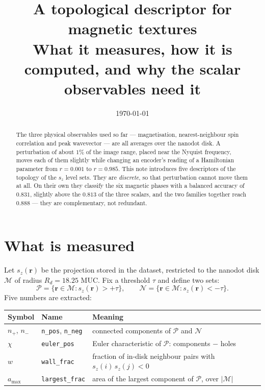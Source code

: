 \documentclass[11pt,a4paper]{article}
\title{A topological descriptor for magnetic textures\\
       \large What it measures, how it is computed, and why the scalar observables need it}
\author{}
\date{\today}
\begin{document}
\maketitle

\begin{abstract}
The three physical observables used so far --- magnetisation, nearest-neighbour spin
correlation and peak wavevector --- are all averages over the nanodot disk. A perturbation
of about $1\%$ of the image range, placed near the Nyquist frequency, moves each of them
slightly while changing an encoder's reading of a Hamiltonian parameter from $r=0.001$ to
$r=0.985$. This note introduces five descriptors of the topology of the $s_z$ level sets.
They are \emph{discrete}, so that perturbation cannot move them at all. On their own they
classify the six magnetic phases with a balanced accuracy of $0.831$, slightly above the
$0.813$ of the three scalars, and the two families together reach $0.888$ --- they are
complementary, not redundant.
\end{abstract}

\section{What is measured}

Let $s_z(\mathbf{r})$ be the projection stored in the dataset, restricted to the nanodot
disk $\mathcal{M}$ of radius $R_d = 18.25$ MUC. Fix a threshold $\tau$ and define two sets:
\[
  \mathcal{P} = \{\mathbf{r}\in\mathcal{M} : s_z(\mathbf{r}) > +\tau\},
  \qquad
  \mathcal{N} = \{\mathbf{r}\in\mathcal{M} : s_z(\mathbf{r}) < -\tau\}.
\]
Five numbers are extracted:

\begin{center}\small
\begin{tabular}{lll}
\toprule
Symbol & Name & Meaning \\
\midrule
$n_+$, $n_-$ & \texttt{n\_pos}, \texttt{n\_neg} & connected components of $\mathcal{P}$ and $\mathcal{N}$ \\
$\chi$ & \texttt{euler\_pos} & Euler characteristic of $\mathcal{P}$: components $-$ holes \\
$w$ & \texttt{wall\_frac} & fraction of in-disk neighbour pairs with $s_z(i)\,s_z(j)<0$ \\
$a_{\max}$ & \texttt{largest\_frac} & area of the largest component of $\mathcal{P}$, over $|\mathcal{M}|$ \\
\bottomrule
\end{tabular}
\end{center}
\end{document}
